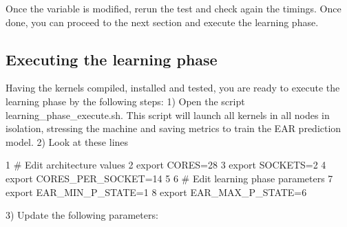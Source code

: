 Once the variable is modified, rerun the test and check again the timings. Once done, you can proceed to the next section and execute the learning phase.

\subsection*{Executing the learning phase }

Having the kernels compiled, installed and tested, you are ready to execute the learning phase by the following steps\+: 1) Open the script {\ttfamily learning\+\_\+phase\+\_\+execute.\+sh}. This script will launch all kernels in all nodes in isolation, stressing the machine and saving metrics to train the E\+AR prediction model. 2) Look at these lines 
\begin{DoxyCode}
1 # Edit architecture values
2 export CORES=28
3 export SOCKETS=2
4 export CORES\_PER\_SOCKET=14
5 
6 # Edit learning phase parameters
7 export EAR\_MIN\_P\_STATE=1
8 export EAR\_MAX\_P\_STATE=6
\end{DoxyCode}
 3) Update the following parameters\+:~\newline

